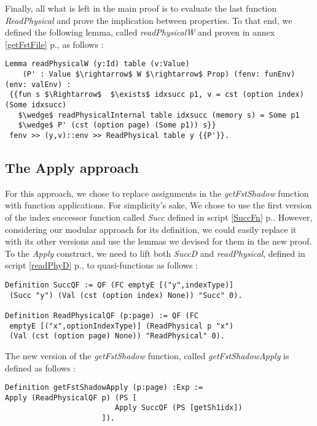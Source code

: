 Finally, all what is left in the main proof is to evaluate the last function \textit{ReadPhysical} and prove the implication between properties. To that end, we defined the following lemma, called \textit{readPhysicalW} and proven in annex \ref{getFstFile} p.\pageref{getFstFile}, as follows : 
\begin{lstlisting}[caption = {readPhysicalW Lemma definition and proof}, xleftmargin=-.08\textwidth,
xrightmargin=-.08\textwidth,mathescape=true]
Lemma readPhysicalW (y:Id) table (v:Value) 
	(P' : Value $\rightarrow$ W $\rightarrow$ Prop) (fenv: funEnv) (env: valEnv) :
 {{fun s $\Rightarrow$  $\exists$ idxsucc p1, v = cst (option index) (Some idxsucc)
   $\wedge$ readPhysicalInternal table idxsucc (memory s) = Some p1 
   $\wedge$ P' (cst (option page) (Some p1)) s}} 
 fenv >> (y,v)::env >> ReadPhysical table y {{P'}}.
\end{lstlisting} \vspace{4pt}

\subsection{The Apply approach}
For this approach, we chose to replace assignments in the \textit{getFstShadow} function with function applications. For simplicity’s sake,  We chose to use the first version of the index successor function called \textit{Succ} defined in script \ref{SuccFn} p.\pageref{SuccFn}. However, considering our modular approach for its definition, we could easily replace it with its other versions and use the lemmas we devised for them in the new proof. To the \textit{Apply} construct, we need to lift both \textit{SuccD} and \textit{readPhysical}, defined in script \ref{readPhyD} p.\pageref{readPhyD}, to quasi-functions as follows :
\begin{lstlisting}[caption = {Lifting Succ and  readPhysical to quasi-functions}, mathescape=true]
Definition SuccQF := QF (FC emptyE [("y",indexType)] 
 (Succ "y") (Val (cst (option index) None)) "Succ" 0).

Definition ReadPhysicalQF (p:page) := QF (FC 
 emptyE [("x",optionIndexType)] (ReadPhysical p "x") 
 (Val (cst (option page) None)) "ReadPhysical" 0).
\end{lstlisting} \vspace{4pt}
The new version of the \textit{getFstShadow} function, called \textit{getFstShadowApply} is defined as follows :
\begin{lstlisting}[caption = {getFstShadowApply definition}, mathescape=true]
Definition getFstShadowApply (p:page) :Exp :=
Apply (ReadPhysicalQF p) (PS [
                         Apply SuccQF (PS [getSh1idx])
                      ]). 
\end{lstlisting} \vspace{4pt}

